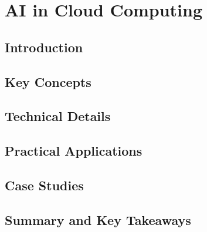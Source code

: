 ﻿%

\chapter{AI in Cloud Computing}
\label{ch:chapter-17}

\section{Introduction}


\section{Key Concepts}


\section{Technical Details}


\section{Practical Applications}


\section{Case Studies}


\section{Summary and Key Takeaways}


